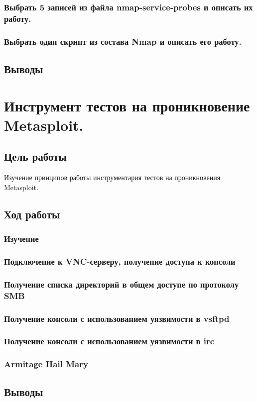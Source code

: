 \documentclass[a4paper, 14pt]{article}				%
\begin{document}
\subsubsection{Выбрать 5 записей из файла nmap-service-probes и описать их работу.}



\subsubsection{Выбрать один скрипт из состава Nmap и описать его работу.}


\subsection{Выводы}


\section{Инструмент тестов на проникновение Metasploit.}

\subsection{Цель работы}
Изучение принципов работы инструментария тестов на проникновения Metasploit.
\subsection{Ход работы}



\subsubsection{Изучение}



\subsubsection{Подключение к VNC-серверу, получение доступа к консоли}



\subsubsection{Получение списка директорий в общем доступе по протоколу SMB}



\subsubsection{Получение консоли с использованием уязвимости в vsftpd}



\subsubsection{Получение консоли с использованием уязвимости в irc}


\subsubsection{Armitage Hail Mary}


\subsection{Выводы}
\end{document}
